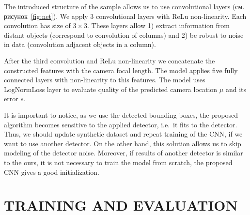 The introduced structure of the sample allows us to use convolutional layers (см. рисунок~\ref{fig:net}). We apply 3 convolutional layers with ReLu non-linearity. Each convolution has size of $3\times3$. These layers allow 1) extract information from distant objects (correspond to convolution of columns) and 2) be robust to noise in data (convolution adjacent objects in a column).

After the third convolution and ReLu non-linearity we concatenate the constructed features with the camera focal length. The model applies five fully connected layers with non-linearity to this features. The model uses LogNormLoss layer to evaluate quality of the predicted camera location $\mu$ and its error $s$.

It is important to notice, as we use the detected bounding boxes, the proposed algorithm becomes sensitive to the applied detector, i.e.\ it fits to the detector. Thus, we should update synthetic dataset and repeat training of the CNN, if we want to use another detector. On the other hand, this solution allows us to skip modeling of the detector noise. Moreover, if results of another detector is similar to the ours, it is not necessary to train the model from scratch, the proposed CNN gives a good initialization.

\section{\uppercase{Training and Evaluation}}
\label{sec:evaluation}

